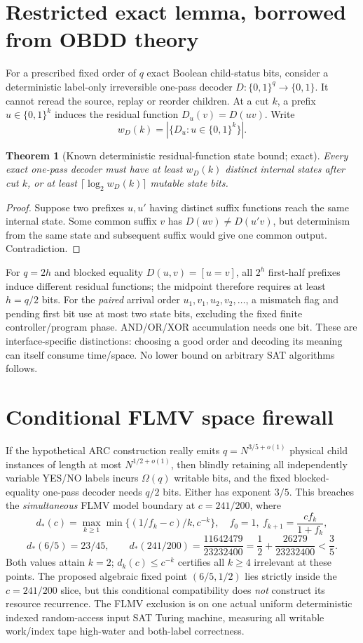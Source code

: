 \documentclass[10pt]{article}
\newtheorem{theorem}{Theorem}
\begin{document}
\section{Restricted exact lemma, borrowed from OBDD theory}
For a prescribed fixed order of $q$ exact Boolean child-status bits, consider a deterministic label-only irreversible one-pass decoder $D:\{0,1\}^q\to\{0,1\}$. It cannot reread the source, replay or reorder children. At a cut $k$, a prefix $u\in\{0,1\}^k$ induces the residual function $D_u(v)=D(uv)$. Write
\[w_D(k)=|\{D_u:u\in\{0,1\}^k\}|.\]
\begin{theorem}[Known deterministic residual-function state bound; exact]
Every exact one-pass decoder must have at least $w_D(k)$ distinct internal states after cut $k$, or at least $\lceil\log_2 w_D(k)\rceil$ mutable state bits.
\end{theorem}
\begin{proof}Suppose two prefixes $u,u'$ having distinct suffix functions reach the same internal state. Some common suffix $v$ has $D(uv)\ne D(u'v)$, but determinism from the same state and subsequent suffix would give one common output. Contradiction.\end{proof}
For $q=2h$ and blocked equality $D(u,v)=[u=v]$, all $2^h$ first-half prefixes induce different residual functions; the midpoint therefore requires at least $h=q/2$ bits. For the \emph{paired} arrival order $u_1,v_1,u_2,v_2,\ldots$, a mismatch flag and pending first bit use at most two state bits, excluding the fixed finite controller/program phase. AND/OR/XOR accumulation needs one bit. These are interface-specific distinctions: choosing a good order and decoding its meaning can itself consume time/space. No lower bound on arbitrary SAT algorithms follows.
\section{Conditional FLMV space firewall}
If the hypothetical ARC construction really emits $q=N^{3/5+o(1)}$ physical child instances of length at most $N^{1/2+o(1)}$, then blindly retaining all independently variable YES/NO labels incurs $\Omega(q)$ writable bits, and the fixed blocked-equality one-pass decoder needs $q/2$ bits. Either has exponent $3/5$. This breaches the \emph{simultaneous} FLMV model boundary at $c=241/200$, where
\[d_*(c)=\max_{k\ge1}\min\{(1/f_k-c)/k,c^{-k}\},\quad f_0=1,\ f_{k+1}=\frac{cf_k}{1+f_k},\]
\[d_*(6/5)=23/45,\qquad d_*(241/200)=\frac{11642479}{23232400}=\frac12+\frac{26279}{23232400}<\frac35.\]
Both values attain $k=2$; $d_k(c)\le c^{-k}$ certifies all $k\ge4$ irrelevant at these points. The proposed algebraic fixed point $(6/5,1/2)$ lies strictly inside the $c=241/200$ slice, but this conditional compatibility does \emph{not} construct its resource recurrence. The FLMV exclusion is on one actual uniform deterministic indexed random-access input SAT Turing machine, measuring all writable work/index tape high-water and both-label correctness.
\end{document}
